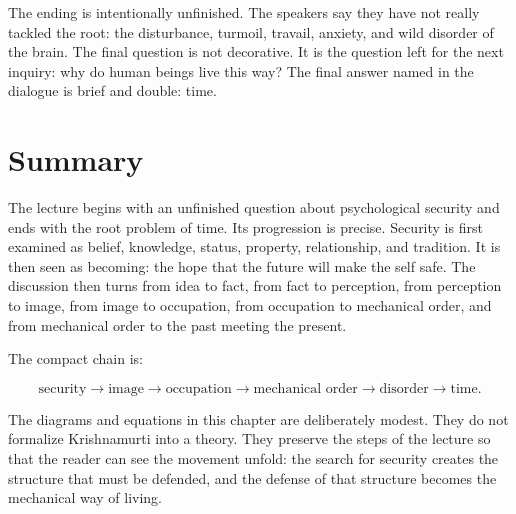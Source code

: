 The ending is intentionally unfinished. The speakers say they have not really tackled the root: the disturbance, turmoil, travail, anxiety, and wild disorder of the brain. The final question is not decorative. It is the question left for the next inquiry: why do human beings live this way? The final answer named in the dialogue is brief and double: time.

\section{Summary}

The lecture begins with an unfinished question about psychological security and ends with the root problem of time. Its progression is precise. Security is first examined as belief, knowledge, status, property, relationship, and tradition. It is then seen as becoming: the hope that the future will make the self safe. The discussion then turns from idea to fact, from fact to perception, from perception to image, from image to occupation, from occupation to mechanical order, and from mechanical order to the past meeting the present.

The compact chain is:

\begin{equation}
\text{security}
\longrightarrow
\text{image}
\longrightarrow
\text{occupation}
\longrightarrow
\text{mechanical order}
\longrightarrow
\text{disorder}
\longrightarrow
\text{time}.
\end{equation}

The diagrams and equations in this chapter are deliberately modest. They do not formalize Krishnamurti into a theory. They preserve the steps of the lecture so that the reader can see the movement unfold: the search for security creates the structure that must be defended, and the defense of that structure becomes the mechanical way of living.